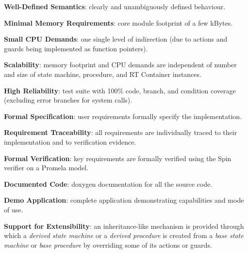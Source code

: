 \begin{fw_itemize} 
\item{} \textbf{Well-{}Defined Semantics}: clearly and unambiguously defined behaviour.
\item{} \textbf{Minimal Memory Requirements}: core module footprint of a few kBytes.
\item{} \textbf{Small CPU Demands}: one single level of indirection (due to actions and guards being implemented as function pointers).
\item{} \textbf{Scalability}: memory footprint and CPU demands are independent of number and size of state machine, procedure, and RT Container instances.
\item{} \textbf{High Reliability}: test suite with 100\% code, branch, and condition coverage (excluding error branches for system calls).
\item{} \textbf{Formal Specification}: user requirements formally specify the implementation.
\item{} \textbf{Requirement Traceability}: all requirements are individually traced to their implementation and to verification evidence.
\item{} \textbf{Formal Verification}: key requirements are formally verified using the Spin verifier on a Promela model.
\item{} \textbf{Documented Code}: doxygen documentation for all the source code.
\item \textbf{Demo Application}: complete application demonstrating capabilities and mode of use.
\item{} \textbf{Support for Extensibility}: an inheritance-like mechanism is provided through which a \emph{derived state machine} or a \emph{derived procedure} is created from a \emph{base state machine} or \emph{base procedure} by overriding some of its actions or guards.
\end{fw_itemize}
